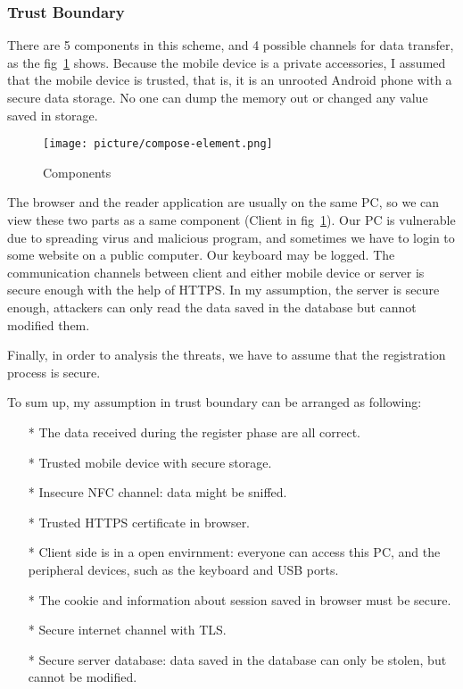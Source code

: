 \begin{CJK}{Bg5}{bsmi}
\subsubsection{Trust Boundary}

There are 5 components in this scheme, and 4 possible channels for data transfer, as the fig~\ref{fig:compose-element} shows. Because the mobile device is a private accessories, I assumed that the mobile device is trusted, that is, it is an unrooted Android phone with a secure data storage. No one can dump the memory out or changed any value saved in storage. 

\begin{figure}
\centering
\texttt{[image: picture/compose-element.png]}
\caption{Components}
\label{fig:compose-element}
\end{figure}

The browser and the reader application are usually on the same PC, so we can view these two parts as a same component (Client in fig~\ref{fig:compose-element}). Our PC is vulnerable due to spreading virus and malicious program, and sometimes we have to login to some website on a public computer. Our keyboard may be logged. The communication channels between client and either mobile device or server is secure enough with the help of HTTPS. In my assumption, the server is secure enough, attackers can only read the data saved in the database but cannot modified them.

Finally, in order to analysis the threats, we have to assume that the registration process is secure.

To sum up, my assumption in trust boundary can be arranged as following:
\begin{enumerate}
\item[*] The data received during the register phase are all correct.
\item[*] Trusted mobile device with secure storage.
\item[*] Insecure NFC channel: data might be sniffed.
\item[*] Trusted HTTPS certificate in browser.
\item[*] Client side is in a open envirnment: everyone can access this PC, and the peripheral devices, such as the keyboard and USB ports.
\item[*] The cookie and information about session saved in browser must be secure.
\item[*] Secure internet channel with TLS.
\item[*] Secure server database: data saved in the database can only be stolen, but cannot be modified.
\end{enumerate}


\end{CJK}
